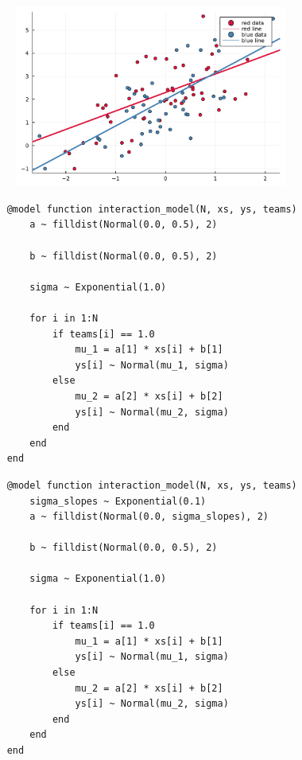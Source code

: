 \documentclass[aspectratio=169,xcolor=svgnames]{beamer}
\begin{document}
\begin{frame}
  \begin{figure}[ht]
    \centering
    \includegraphics[width=0.8\textwidth]{figures/plot_interaction.pdf}
  \end{figure}
\end{frame}

\begin{frame}[fragile]
  \begin{verbatim}
    @model function interaction_model(N, xs, ys, teams)
        a ~ filldist(Normal(0.0, 0.5), 2)

        b ~ filldist(Normal(0.0, 0.5), 2)

        sigma ~ Exponential(1.0)

        for i in 1:N
            if teams[i] == 1.0
                mu_1 = a[1] * xs[i] + b[1]
                ys[i] ~ Normal(mu_1, sigma)
            else
                mu_2 = a[2] * xs[i] + b[2]
                ys[i] ~ Normal(mu_2, sigma)
            end
        end
    end
  \end{verbatim}
\end{frame}

\begin{frame}[fragile]
  \begin{verbatim}
    @model function interaction_model(N, xs, ys, teams)
        sigma_slopes ~ Exponential(0.1)
        a ~ filldist(Normal(0.0, sigma_slopes), 2)

        b ~ filldist(Normal(0.0, 0.5), 2)

        sigma ~ Exponential(1.0)

        for i in 1:N
            if teams[i] == 1.0
                mu_1 = a[1] * xs[i] + b[1]
                ys[i] ~ Normal(mu_1, sigma)
            else
                mu_2 = a[2] * xs[i] + b[2]
                ys[i] ~ Normal(mu_2, sigma)
            end
        end
    end
  \end{verbatim}
\end{frame}
\end{document}
